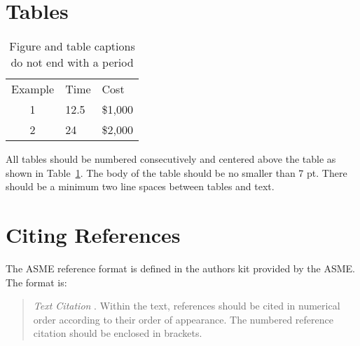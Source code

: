 \documentclass[12pt]{asme2ej}
\begin{document}


    \section{Tables}

    \begin{table}[t]
        \caption{Figure and table captions do not end with a period}
        \begin{center}
            \label{table_ASME}
            \begin{tabular}{c l l}
                &      &         \\ %
                \hline
                Example & Time & Cost    \\
                \hline
                1       & 12.5 & \$1,000 \\
                2       & 24   & \$2,000 \\
                \hline
            \end{tabular}
        \end{center}
    \end{table}

    All tables should be numbered consecutively and centered above the table as shown in Table~\ref{table_ASME}. The body of the table should be no smaller than 7 pt. There should be a minimum two line spaces between tables and text.




    \section{Citing References}

    The ASME reference format is defined in the authors kit provided by the ASME. The format is:

    \begin{quotation}
    {\em Text Citation}
        . Within the text, references should be cited in numerical order according to their order of appearance. The numbered reference citation should be enclosed in brackets.
    \end{quotation}
\end{document}
